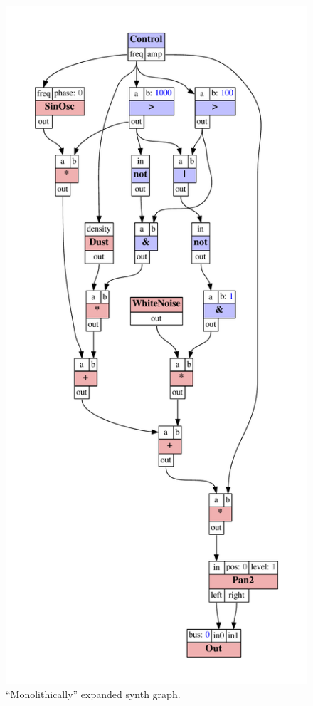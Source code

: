 \documentclass[11pt,a4paper]{article}
\begin{document}
\begin{figure}
\centering
\includegraphics[scale=0.5]{figures/ugen-if-mono.pdf}
\caption{``Monolithically'' expanded synth graph.}
\label{fig:ugen-mono}
\end{figure}
\end{document}
